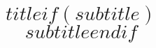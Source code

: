 \documentclass[12pt]{article} %
\begin{document}










 
\title{\bigskip \bigskip \textbf  {$title$$if(subtitle)$\\{\large $subtitle$}$endif$}}
\end{document}
